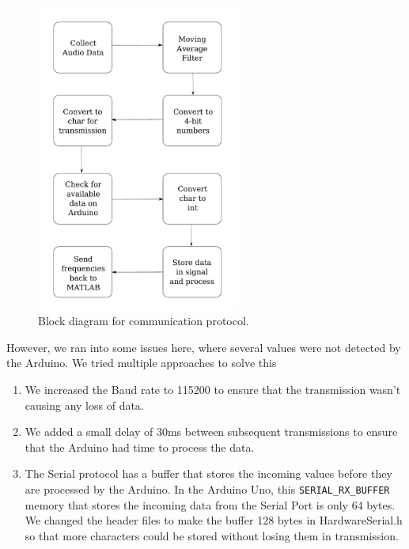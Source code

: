 \begin{figure}[ht]
    \centering
    \includegraphics[width=0.6\textwidth]{fig/commsblock.pdf}
    \caption{Block diagram for communication protocol.}
    \label{fig:commsblock}
\end{figure}

However, we ran into some issues here, where several values were not detected by
the Arduino. We tried multiple approaches to solve this 

\begin{enumerate}
    \item We increased the Baud rate to 115200 to ensure that the transmission
    wasn't causing any loss of data. 

    \item We added a small delay of 30ms between subsequent transmissions to
    ensure that the Arduino had time to process the data.

    \item The Serial protocol has a buffer that stores the incoming values
    before they are processed by the Arduino. In the Arduino Uno, this
    \texttt{SERIAL\_RX\_BUFFER} memory that stores the incoming data from the
    Serial Port is only 64 bytes. We changed the header files to make the buffer
    128 bytes in HardwareSerial.h so that more characters could be stored
    without losing them in transmission.
\end{enumerate}

